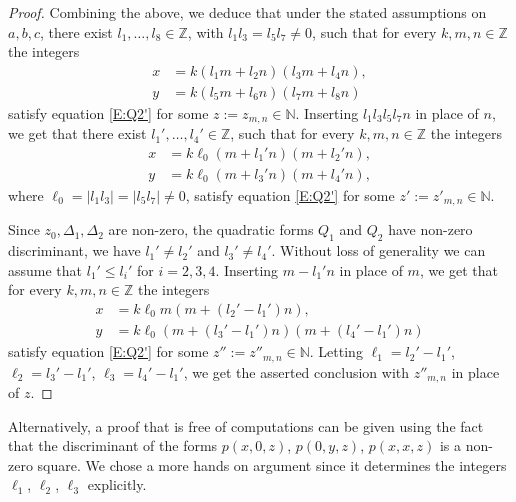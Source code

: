 \documentclass[11pt]{amsart}
\theoremstyle{definition}
\begin{document}
\begin{proof}
Combining the above, we deduce that under the stated assumptions on
$a,b,c$,  there exist    $l_1,\ldots, l_8\in
{{\mathbb Z}}$, with $l_1 l_3=l_5l_7\neq 0$, such that for every $k,m,n\in{{\mathbb Z}}$ the integers
\begin{align*}
x&=k(l_1m+l_2n)(l_3m+l_4n),\\
 y&=k(l_5m+l_6n)(l_7m+l_8n)
 \end{align*}
satisfy  equation \eqref{E:Q2'} for some $z:=z_{m,n}\in {{\mathbb N}}$.
Inserting $l_1l_3l_5l_7n$ in place of $n$, we get that there exist
$l_1',\ldots, l_4'\in {{\mathbb Z}}$, such that for every $k,m,n\in{{\mathbb Z}}$ the
integers
\begin{align*}
x&=k\ell_0(m+l_1'n)(m+l_2'n),\\
y&=k\ell_0(m+l_3'n)(m+l_4'n),
\end{align*}
where $\ell_0=|l_1l_3|=|l_5l_7|\neq 0$, satisfy  equation
\eqref{E:Q2'} for some $z':=z'_{m,n}\in {{\mathbb N}}$.

Since $z_0,\Delta_1, \Delta_2$ are non-zero, the quadratic forms
$Q_1$ and $Q_2$ have non-zero discriminant, we have $l_1'\neq l_2'$
and $l_3'\neq l_4'$. Without loss of generality we can assume that
$l_1'\leq l_i'$ for $i=2,3,4$. Inserting $m-l_1'n$ in place of $m$,
we get that for every $k,m,n\in{{\mathbb Z}}$ the integers
\begin{align*}
x&=k\ell_0m(m+(l_2'-l_1')n),\\
y&=k\ell_0(m+(l_3'-l_1')n)(m+(l_4'-l_1')n)
\end{align*}
 satisfy  equation \eqref{E:Q2'} for some $z'':=z''_{m,n}\in {{\mathbb N}}$.
 Letting
$\ell_1=l_2'-l_1'$, $\ell_2=l_3'-l_1'$, $\ell_3=l_4'-l_1'$, we get
the asserted conclusion with  $z''_{m,n}$ in place of $z$.
\end{proof}
Alternatively, a   proof that is free of computations can be
given using the fact that the discriminant of the forms $p(x,0,z)$,
$p(0,y,z)$, $p(x,x,z)$ is a non-zero    square. We chose a more
hands on argument  since it determines the integers $\ell_1$,
$\ell_2$, $\ell_3$ explicitly.
\end{document}
